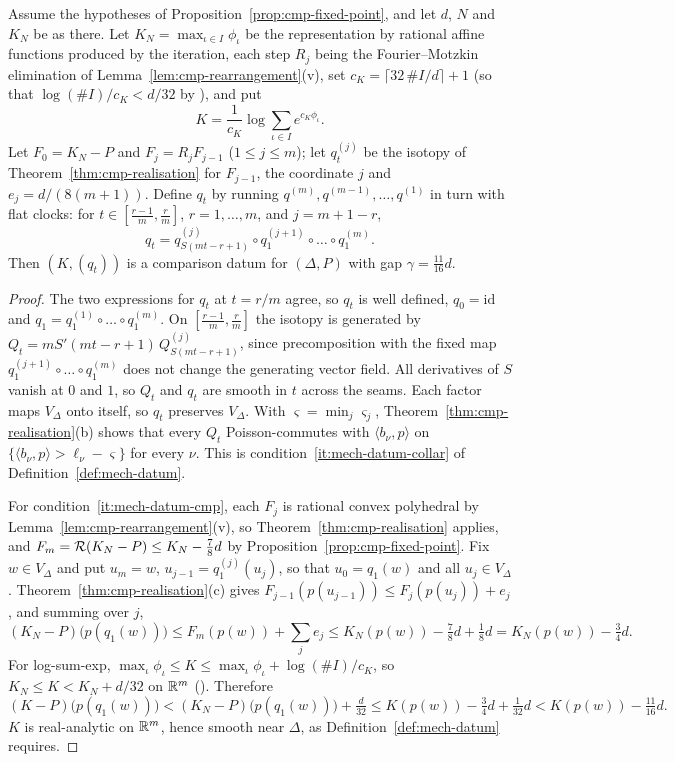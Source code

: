 \begin{theorem}\label{thm:cmp-main}
Assume the hypotheses of Proposition~\ref{prop:cmp-fixed-point}, and let $d$, $N$ and $K_N$ be as there. Let
$K_N=\max_{\iota\in I}\phi_\iota$ be the representation by rational affine functions produced by the iteration, each
step $R_j$ being the Fourier--Motzkin elimination of Lemma~\ref{lem:cmp-rearrangement}(v), set
$c_K=\lceil32\,\#I/d\rceil+1$ (so that $\log(\#I)/c_K<d/32$ by ), and put
\[
 K=\frac1{c_K}\log\sum_{\iota\in I}e^{c_K\phi_\iota}.
\]
Let $F_0=K_N-P$ and $F_j=R_jF_{j-1}$ ($1\le j\le m$); let $q^{(j)}_t$ be the isotopy of
Theorem~\ref{thm:cmp-realisation} for $F_{j-1}$, the coordinate $j$ and $e_j=d/(8(m+1))$. Define $q_t$ by running
$q^{(m)},q^{(m-1)},\dots,q^{(1)}$ in turn with flat clocks: for $t\in[\frac{r-1}m,\frac rm]$, $r=1,\dots,m$, and
$j=m+1-r$,
\[
 q_t=q^{(j)}_{S(mt-r+1)}\circ q^{(j+1)}_1\circ\dots\circ q^{(m)}_1 .
\]
Then $(K,(q_t))$ is a comparison datum for $(\Delta,P)$ with gap $\gamma=\tfrac{11}{16}d$.
\end{theorem}

\begin{proof}
The two expressions for $q_t$ at $t=r/m$ agree, so $q_t$ is well defined, $q_0=\mathrm{id}$ and
$q_1=q^{(1)}_1\circ\dots\circ q^{(m)}_1$. On $[\frac{r-1}m,\frac rm]$ the isotopy is generated by
$Q_t=mS'(mt-r+1)\,Q^{(j)}_{S(mt-r+1)}$, since precomposition with the fixed map
$q^{(j+1)}_1\circ\dots\circ q^{(m)}_1$ does not change the generating vector field. All derivatives of $S$ vanish at
$0$ and $1$, so $Q_t$ and $q_t$ are smooth in $t$ across the seams. Each factor maps $V_\Delta$ onto itself, so $q_t$
preserves $V_\Delta$. With $\varsigma=\min_j\varsigma_j$, Theorem~\ref{thm:cmp-realisation}(b) shows that every $Q_t$
Poisson-commutes with $\langle b_\nu,p\rangle$ on $\{\langle b_\nu,p\rangle>\ell_\nu-\varsigma\}$ for every $\nu$. This is
condition~\ref{it:mech-datum-collar} of Definition~\ref{def:mech-datum}.

For condition~\ref{it:mech-datum-cmp}, each $F_j$ is rational convex polyhedral by Lemma~\ref{lem:cmp-rearrangement}(v), so
Theorem~\ref{thm:cmp-realisation} applies, and $F_m=\mathcal{R}(K_N-P)\le K_N-\tfrac78d$ by
Proposition~\ref{prop:cmp-fixed-point}. Fix $w\in V_\Delta$ and put $u_m=w$, $u_{j-1}=q^{(j)}_1(u_j)$, so that
$u_0=q_1(w)$ and all $u_j\in V_\Delta$. Theorem~\ref{thm:cmp-realisation}(c) gives
$F_{j-1}(p(u_{j-1}))\le F_j(p(u_j))+e_j$, and summing over $j$,
\[
 (K_N-P)\bigl(p(q_1(w))\bigr)\le F_m(p(w))+\sum_je_j\le K_N(p(w))-\tfrac78d+\tfrac18d=K_N(p(w))-\tfrac34d .
\]
For log-sum-exp, $\max_\iota\phi_\iota\le K\le\max_\iota\phi_\iota+\log(\#I)/c_K$, so $K_N\le K<K_N+d/32$ on $\mathbb{R}^m$
(). Therefore
\[
 (K-P)\bigl(p(q_1(w))\bigr)<(K_N-P)\bigl(p(q_1(w))\bigr)+\tfrac{d}{32}\le K(p(w))-\tfrac34d+\tfrac1{32}d
 <K(p(w))-\tfrac{11}{16}d .
\]
$K$ is real-analytic on $\mathbb{R}^m$, hence smooth near $\Delta$, as Definition~\ref{def:mech-datum} requires.
\end{proof}

